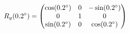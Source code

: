 \documentclass[preview]{standalone}
\begin{document}
\begin{align*}
\special{dvisvgm:raw <g id='unique000'>}R_y(0.2^\circ) = \begin{pmatrix} \cos(0.2^\circ) & 0 & -\sin(0.2^\circ) \\ 0 & 1 & 0 \\ \sin(0.2^\circ) & 0 & \cos(0.2^\circ) \end{pmatrix}\special{dvisvgm:raw </g>}
\end{align*}
\end{document}
